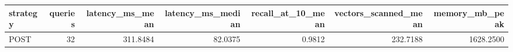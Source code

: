 \begin{tabular}{lrrrrrr}
\toprule
strategy & queries & latency_ms_mean & latency_ms_median & recall_at_10_mean & vectors_scanned_mean & memory_mb_peak \\
\midrule
POST & 32 & 311.8484 & 82.0375 & 0.9812 & 232.7188 & 1628.2500 \\
\bottomrule
\end{tabular}
